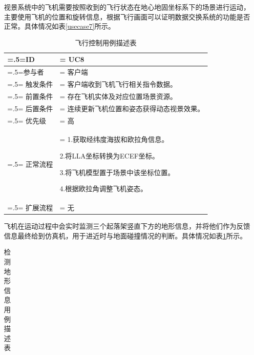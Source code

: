 {\par
视景系统中的飞机需要按照收到的飞行状态在地心地固坐标系下的场景进行运动，主要使用飞机的位置和旋转信息，根据飞行画面可以证明数据交换系统的功能是否正常。具体情况如表\ref{usecase7}所示。
\begin{table}[htbp]
    \begin{center}
        \caption{飞行控制用例描述表}
        \label{usecase8}
        \renewcommand\arraystretch{1.5}
        \begin{tabularx}{0.8\textwidth}{ 
            | >{\centering\arraybackslash\hsize=.5\hsize\linewidth=\hsize}X 
            | >{\raggedright\arraybackslash\hsize=1.5\hsize\linewidth=\hsize}X 
            | }
            \hline
            \textbf{ID} & \textbf{UC8}\\
            \hline
            参与者 & 客户端\\
            \hline
            触发条件 & 客户端收到飞机飞行相关指令数据。\\
            \hline
            前置条件 & 存在飞机实体及对应位置场景资源。\\
            \hline
            后置条件 & 连续更新飞机位置和姿态获得动态视景效果。\\
            \hline
            优先级 & 高\\
            \hline
            正常流程 & 1.获取经纬度海拔和欧拉角信息。\par 2.将LLA坐标转换为ECEF坐标。\par 3.将飞机模型置于场景中该坐标位置。\par 4.根据欧拉角调整飞机姿态。\\
            \hline
            扩展流程 & 无\\
            \hline
        \end{tabularx}
    \end{center}
\end{table}
\par
飞机在运动过程中会实时监测三个起落架竖直下方的地形信息，并将他们作为反馈信息最终给到仿真机，用于进近时与地面碰撞情况的判断。具体情况如表\ref{usecase8}所示。
\begin{table}[htbp]
    \begin{center}
        \caption{检测地形信息用例描述表}
        \label{usecase9}
        \renewcommand\arraystretch{1.5}
        \begin{tabularx}{0.8\textwidth}{ 
            | >{\centering\arraybackslash\hsize=.5\hsize\linewidth=\hsize}X 
            | >{\raggedright\arraybackslash\hsize=1.5\hsize\linewidth=\hsize}X 
            | }

\end{tabularx}
\end{center}
\end{table}}

